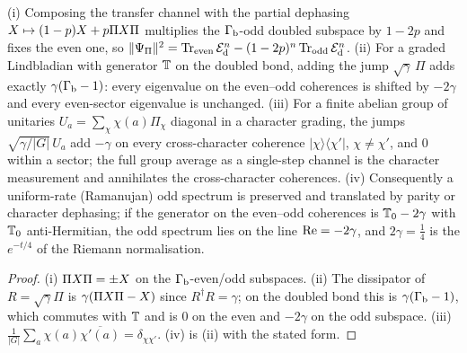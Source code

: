 \begin{proposition}
\label{prop:parity-jump-uniform-shift}
(i) Composing the transfer channel with the partial dephasing $X\mapsto(1-p)X+p\Pi X\Pi$
multiplies the $\Gamma_{\mathrm b}$-odd doubled subspace by $1-2p$ and fixes the even one, so
$\|\Psi_\Pi\|^2 = \operatorname{Tr}_{\mathrm{even}}\mathcal E_{\mathrm d}^n - (1-2p)^n\operatorname{Tr}_{\mathrm{odd}}\mathcal E_{\mathrm d}^n$. (ii) For a graded
Lindbladian with generator $\mathbb T$ on the doubled bond, adding the jump $\sqrt\gamma\,\Pi$ adds exactly
$\gamma(\Gamma_{\mathrm b}-1)$: every eigenvalue on the even--odd coherences is shifted by $-2\gamma$ and every
even-sector eigenvalue is unchanged. (iii) For a finite abelian group of unitaries $U_a = \sum_\chi
\chi(a)\Pi_\chi$ diagonal in a character grading, the jumps $\sqrt{\gamma/|G|}\,U_a$ add $-\gamma$ on
every cross-character coherence $|\chi\rangle\langle\chi'|$, $\chi\ne\chi'$, and $0$ within a sector;
the full group average as a single-step channel is the character measurement and annihilates the
cross-character coherences. (iv) Consequently a uniform-rate (Ramanujan) odd spectrum is preserved
and translated by parity or character dephasing; if the generator on the even--odd coherences is
$\mathbb T_0-2\gamma$ with $\mathbb T_0$ anti-Hermitian, the odd spectrum lies on the line $\operatorname{Re} = -2\gamma$,
and $2\gamma = \tfrac14$ is the $e^{-t/4}$ of the Riemann normalisation.
\end{proposition}

\begin{proof}
(i) $\Pi X\Pi = \pm X$ on the $\Gamma_{\mathrm b}$-even/odd subspaces. (ii) The dissipator of $R = \sqrt\gamma\Pi$
is $\gamma(\Pi X\Pi-X)$ since $R^\dagger R = \gamma$; on the doubled bond this is $\gamma(\Gamma_{\mathrm b}-1)$,
which commutes with $\mathbb T$ and is $0$ on the even and $-2\gamma$ on the odd subspace. (iii)
$\frac{1}{|G|}\sum_a\chi(a)\overline{\chi'(a)} = \delta_{\chi\chi'}$. (iv) is (ii) with the stated form.
\end{proof}


